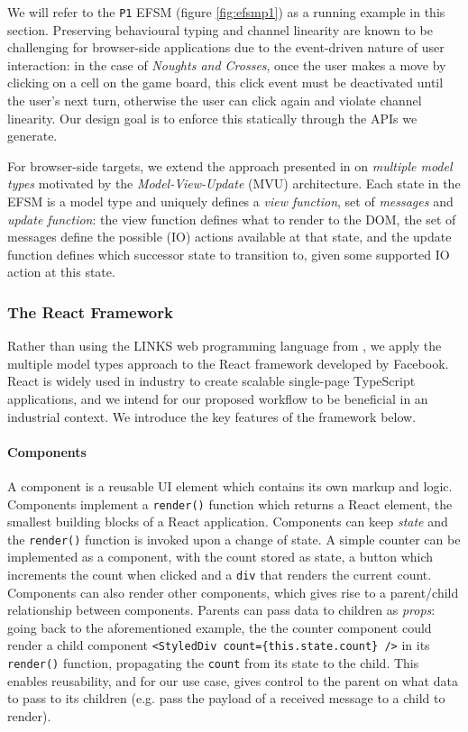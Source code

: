 \documentclass[submission,copyright,creativecommons]{eptcs}
\begin{document}
We will refer to the \texttt{P1} EFSM (figure \ref{fig:efsmp1}) as a running example in this section. Preserving behavioural typing and channel linearity are known to be challenging for browser-side applications due to the event-driven nature of user interaction: in the case of \textit{Noughts and Crosses}, once the user makes a move by clicking on a cell on the game board, this click event must be deactivated until the user's next turn, otherwise the user can click again and violate channel linearity. Our design goal is to enforce this statically through the APIs we generate. 

For browser-side targets, we extend the approach presented in \cite{MVU2019} on \textit{multiple model types} motivated by the \textit{Model-View-Update} (MVU) architecture. Each state in the EFSM is a model type and uniquely defines a \textit{view function}, set of \textit{messages} and \textit{update function}: the view function defines what to render to the DOM, the set of messages define the possible (IO) actions available at that state, and the update function defines which successor state to transition to, given some supported IO action at this state.

\subsubsection{The React Framework}
Rather than using the LINKS web programming language from \cite{MVU2019}, we apply the multiple model types approach to the React framework \cite{React} developed by Facebook. React is widely used in industry to create scalable single-page TypeScript applications, and we intend for our proposed workflow to be beneficial in an industrial context. We introduce the key features of the framework below.

\paragraph{Components} A component is a reusable UI element which contains its own markup and logic. Components implement a \texttt{render()} function which returns a React element, the smallest building blocks of a React application. Components can keep \textit{state} and the \texttt{render()} function is invoked upon a change of state. A simple counter can be implemented as a component, with the count stored as state, a button which increments the count when clicked and a \texttt{div} that renders the current count. Components can also render other components, which gives rise to a parent/child relationship between components. Parents can pass data to children as \textit{props}: going back to the aforementioned example, the the counter component could render a child component \texttt{<StyledDiv count=\{this.state.count\} />} in its \texttt{render()} function, propagating the \texttt{count} from its state to the child. This enables reusability, and for our use case, gives control to the parent on what data to pass to its children (e.g. pass the payload of a received message to a child to render).
\end{document}
